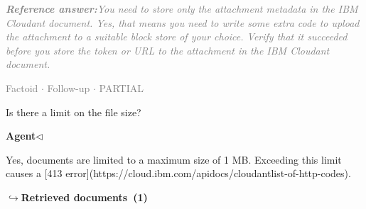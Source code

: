 \documentclass[a4paper,11pt]{article}
\begin{document}
\begin{refanswerenv}
{\footnotesize\textit{\textcolor{gray}{\textbf{Reference answer:}\enspace You need to store only the attachment metadata in the IBM Cloudant document. Yes, that means you need to write some extra code to upload the attachment to a suitable block store of your choice. Verify that it succeeded before you store the token or URL to the attachment in the IBM Cloudant document.}}}
\end{refanswerenv}
\vspace{0.5em}
\hfill{\tiny\textcolor{gray}{Factoid $\cdot$ Follow-up $\cdot$ PARTIAL}}
\begin{userbubble}
Is there a limit on the file size? 
\end{userbubble}
\noindent\hfill{\small\textcolor{agentcolor}{\textbf{Agent\enspace$\triangleleft$}}}
\begin{agentbubble}
Yes, documents are limited to a maximum size of 1 MB. Exceeding this limit causes a [413 error](https://cloud.ibm.com/apidocs/cloudantlist-of-http-codes).
\end{agentbubble}
\noindent\hfill{\footnotesize\textcolor{doccolor}{\textbf{$\hookrightarrow$\enspace Retrieved documents~(1)}}}
\end{document}
